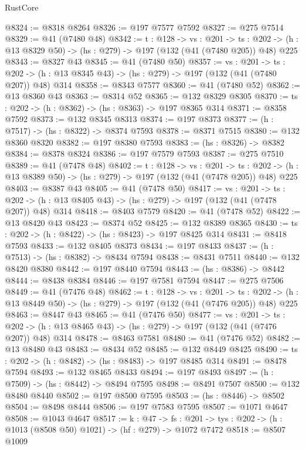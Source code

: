 \begin{lexlean}{RustCore}
\begin{coremodule}
@8324 := @8318 @8264
@8326 := @197 @7577 @7592
@8327 := @275 @7514
@8329 := @41 (@7480 @48)
@8342 := {t : @128} ->
  {vs : @201} ->
  {ts : @202} -> (h : @13 @8329 @50) -> (hs : @279) -> @197 (@132 (@41 (@7480 @205)) @48) @225
@8343 := @8327 @43
@8345 := @41 (@7480 @50)
@8357 := {vs : @201} ->
  {ts : @202} -> (h : @13 @8345 @43) -> (hs : @279) -> @197 (@132 (@41 (@7480 @207)) @48) @314
@8358 := @8343 @7577
@8360 := @41 (@7480 @52)
@8362 := @13 @8360 @43
@8363 := @8314 @52
@8365 := @132 @8329 @8305
@8370 := {ts : @202} -> (h : @8362) -> (hs : @8363) -> @197 @8365 @314
@8371 := @8358 @7592
@8373 := @132 @8345 @8313
@8374 := @197 @8373
@8377 := (h : @7517) -> (hs : @8322) -> @8374 @7593
@8378 := @8371 @7515
@8380 := @132 @8360 @8320
@8382 := @197 @8380 @7593
@8383 := (hs : @8326) -> @8382
@8384 := @8378 @8324
@8386 := @197 @7579 @7593
@8387 := @275 @7510
@8389 := @41 (@7478 @48)
@8402 := {t : @128} ->
  {vs : @201} ->
  {ts : @202} -> (h : @13 @8389 @50) -> (hs : @279) -> @197 (@132 (@41 (@7478 @205)) @48) @225
@8403 := @8387 @43
@8405 := @41 (@7478 @50)
@8417 := {vs : @201} ->
  {ts : @202} -> (h : @13 @8405 @43) -> (hs : @279) -> @197 (@132 (@41 (@7478 @207)) @48) @314
@8418 := @8403 @7579
@8420 := @41 (@7478 @52)
@8422 := @13 @8420 @43
@8423 := @8374 @52
@8425 := @132 @8389 @8365
@8430 := {ts : @202} -> (h : @8422) -> (hs : @8423) -> @197 @8425 @314
@8431 := @8418 @7593
@8433 := @132 @8405 @8373
@8434 := @197 @8433
@8437 := (h : @7513) -> (hs : @8382) -> @8434 @7594
@8438 := @8431 @7511
@8440 := @132 @8420 @8380
@8442 := @197 @8440 @7594
@8443 := (hs : @8386) -> @8442
@8444 := @8438 @8384
@8446 := @197 @7581 @7594
@8447 := @275 @7506
@8449 := @41 (@7476 @48)
@8462 := {t : @128} ->
  {vs : @201} ->
  {ts : @202} -> (h : @13 @8449 @50) -> (hs : @279) -> @197 (@132 (@41 (@7476 @205)) @48) @225
@8463 := @8447 @43
@8465 := @41 (@7476 @50)
@8477 := {vs : @201} ->
  {ts : @202} -> (h : @13 @8465 @43) -> (hs : @279) -> @197 (@132 (@41 (@7476 @207)) @48) @314
@8478 := @8463 @7581
@8480 := @41 (@7476 @52)
@8482 := @13 @8480 @43
@8483 := @8434 @52
@8485 := @132 @8449 @8425
@8490 := {ts : @202} -> (h : @8482) -> (hs : @8483) -> @197 @8485 @314
@8491 := @8478 @7594
@8493 := @132 @8465 @8433
@8494 := @197 @8493
@8497 := (h : @7509) -> (hs : @8442) -> @8494 @7595
@8498 := @8491 @7507
@8500 := @132 @8480 @8440
@8502 := @197 @8500 @7595
@8503 := (hs : @8446) -> @8502
@8504 := @8498 @8444
@8506 := @197 @7583 @7595
@8507 := @1071 @4647
@8508 := @1043 @4647
@8517 := {k : @47} ->
  {fs : @201} -> {tys : @202} -> (h : @1013 (@8508 @50) @1021) -> (hf : @279) -> @1072 @7472
@8518 := @8507 @1009

\end{coremodule}
\end{lexlean}
